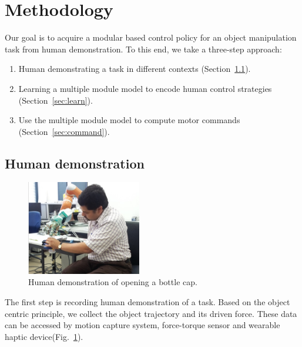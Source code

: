 \section{Methodology}
\label{sec:method}
Our goal is to acquire a modular based control policy for an object manipulation task from human demonstration. To this end, we take a three-step approach:
\begin{enumerate}
\item Human demonstrating a task in different contexts (Section~\ref{sec:demo}).
\item Learning a multiple module model to encode human control strategies (Section~\ref{sec:learn}).
\item Use the multiple module model to compute motor commands (Section~\ref{sec:command}).
\end{enumerate}


\subsection{Human demonstration}
\label{sec:demo}

\begin{figure}
  \centering
  \includegraphics[width=5cm]{./fig/ravin.jpg}
  \caption{ \scriptsize{Human demonstration of opening a bottle cap.}
}
\label{fig:demo}
\end{figure}

The first step is recording human demonstration of a task. Based on the object centric principle, we collect the object trajectory and its driven force. These data can be accessed by motion capture system, force-torque sensor and wearable haptic device(Fig.~\ref{fig:demo}).

